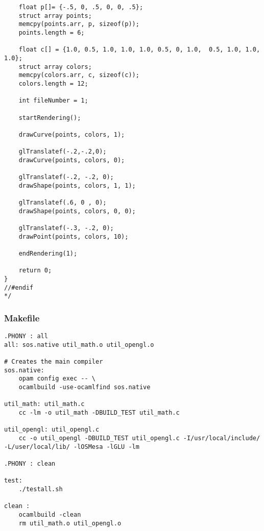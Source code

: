 \documentclass[main.tex]{subfiles}
\begin{document}
\begin{lstlisting}
    float p[]= {-.5, 0, .5, 0, 0, .5};
    struct array points;
    memcpy(points.arr, p, sizeof(p));
    points.length = 6;

    float c[] = {1.0, 0.5, 1.0, 1.0, 1.0, 0.5, 0, 1.0,  0.5, 1.0, 1.0, 1.0};
    struct array colors;
    memcpy(colors.arr, c, sizeof(c));
    colors.length = 12;

    int fileNumber = 1;

    startRendering();

    drawCurve(points, colors, 1);
    
    glTranslatef(-.2,-.2,0);
    drawCurve(points, colors, 0);

    glTranslatef(-.2, -.2, 0);
    drawShape(points, colors, 1, 1);

    glTranslatef(.6, 0 , 0);
    drawShape(points, colors, 0, 0);

    glTranslatef(-.3, -.2, 0);
    drawPoint(points, colors, 10);

    endRendering(1);

    return 0;
}
//#endif
*/
\end{lstlisting}

\subsubsection{Makefile}
\begin{lstlisting}
.PHONY : all
all: sos.native util_math.o util_opengl.o

# Creates the main compiler
sos.native:
	opam config exec -- \
	ocamlbuild -use-ocamlfind sos.native

util_math: util_math.c
	cc -lm -o util_math -DBUILD_TEST util_math.c

util_opengl: util_opengl.c
	cc -o util_opengl -DBUILD_TEST util_opengl.c -I/usr/local/include/ -L/user/local/lib/ -lOSMesa -lGLU -lm

.PHONY : clean

test: 
	./testall.sh

clean : 
	ocamlbuild -clean
	rm util_math.o util_opengl.o

\end{lstlisting}
\end{document}
